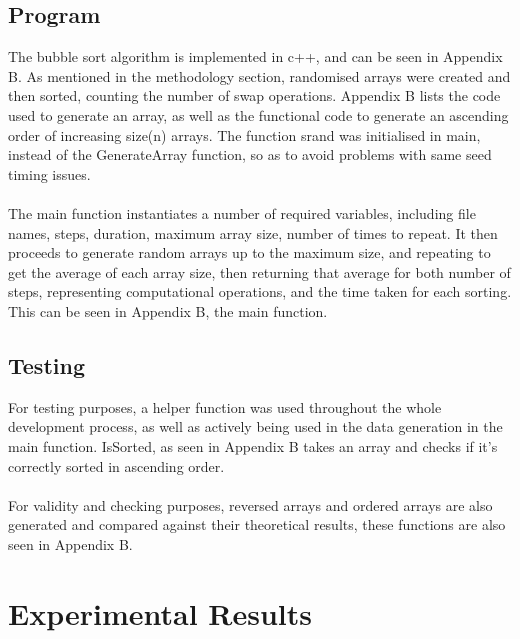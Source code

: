 \documentclass[]{article}
\begin{document}
\subsection{Program}
The bubble sort algorithm is implemented in c++, and can be seen in Appendix B. As mentioned in the methodology section, randomised arrays were created and then sorted, counting the number of swap operations. Appendix B lists the code used to generate an array, as well as the functional code to generate an ascending order of increasing size(n) arrays. The function srand was initialised in main, instead of the GenerateArray function, so as to avoid problems with same seed timing issues.
\\\\
The main function instantiates a number of required variables, including file names, steps, duration, maximum array size, number of times to repeat. It then proceeds to generate random arrays up to the maximum size, and repeating to get the average of each array size, then returning that average for both number of steps, representing computational operations, and the time taken for each sorting. This can be seen in Appendix B, the main function.

\subsection{Testing}
For testing purposes, a helper function was used throughout the whole development process, as well as actively being used in the data generation in the main function. IsSorted, as seen in Appendix B takes an array and checks if it's correctly sorted in ascending order. 
\\\\
For validity and checking purposes, reversed arrays and ordered arrays are also generated and compared against their theoretical results, these functions are also seen in Appendix B. 
\section{Experimental Results}
\end{document}
